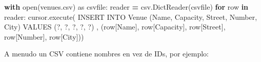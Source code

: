\documentclass[
]{book}
\newenvironment{Shaded}{\begin{snugshade}}{\end{snugshade}}
\newcommand{\BuiltInTok}[1]{#1}
\newcommand{\ControlFlowTok}[1]{\textcolor[rgb]{0.13,0.29,0.53}{\textbf{#1}}}
\newcommand{\ImportTok}[1]{#1}
\newcommand{\KeywordTok}[1]{\textcolor[rgb]{0.13,0.29,0.53}{\textbf{#1}}}
\newcommand{\NormalTok}[1]{#1}
\newcommand{\OperatorTok}[1]{\textcolor[rgb]{0.81,0.36,0.00}{\textbf{#1}}}
\newcommand{\StringTok}[1]{\textcolor[rgb]{0.31,0.60,0.02}{#1}}
\theoremstyle{break}
\theoremstyle{nonumberplain}
\begin{document}
\begin{Shaded}
\begin{Highlighting}[]
\ControlFlowTok{with} \BuiltInTok{open}\NormalTok{(}\StringTok{\textquotesingle{}venues.csv\textquotesingle{}}\NormalTok{) }\ImportTok{as}\NormalTok{ csvfile:}
\NormalTok{    reader }\OperatorTok{=}\NormalTok{ csv.DictReader(csvfile)}
    \ControlFlowTok{for}\NormalTok{ row }\KeywordTok{in}\NormalTok{ reader:}
\NormalTok{        cursor.execute(}\StringTok{\textquotesingle{}\textquotesingle{}\textquotesingle{}}
\StringTok{            INSERT INTO Venue (Name, Capacity, Street, Number, City)}
\StringTok{            VALUES (?, ?, ?, ?, ?)}
\StringTok{        \textquotesingle{}\textquotesingle{}\textquotesingle{}}\NormalTok{, (row[}\StringTok{\textquotesingle{}Name\textquotesingle{}}\NormalTok{], row[}\StringTok{\textquotesingle{}Capacity\textquotesingle{}}\NormalTok{], row[}\StringTok{\textquotesingle{}Street\textquotesingle{}}\NormalTok{], row[}\StringTok{\textquotesingle{}Number\textquotesingle{}}\NormalTok{], row[}\StringTok{\textquotesingle{}City\textquotesingle{}}\NormalTok{]))}
\end{Highlighting}
\end{Shaded}

A menudo un CSV contiene nombres en vez de IDs, por ejemplo:
\end{document}
